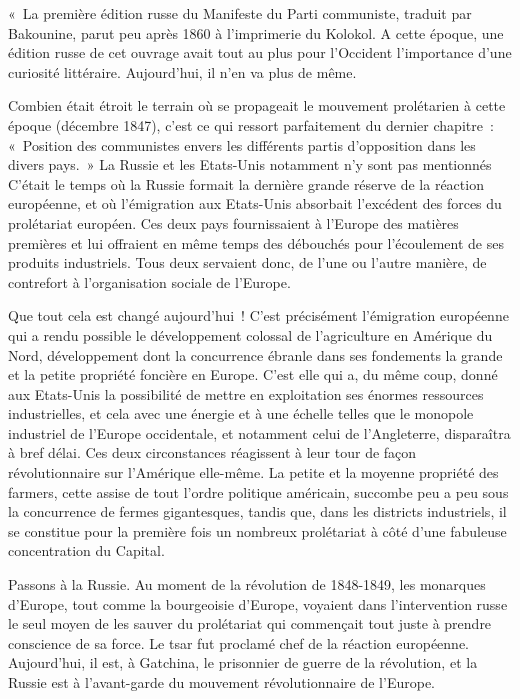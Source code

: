 \documentclass[french,twoside]{book} %
\newenvironment{quoteblock}%
  {\begin{quoting}}
  {\end{quoting}}
\newenvironment{quotebar}{%
    \def\FrameCommand{{\color{rubric!10!}\vrule width 0.5em} \hspace{0.9em}}%
    \def\OuterFrameSep{\itemsep} %
    \MakeFramed {\advance\hsize-\width \FrameRestore}
  }%
  {%
    \endMakeFramed
  }
\renewenvironment{quoteblock}%
  {%
    \savenotes
    \setstretch{0.9}
    \normalfont
    \begin{quotebar}
  }
  {%
    \end{quotebar}
    \spewnotes
  }
\begin{document}
\begin{quoteblock}
 \noindent « La première édition russe du Manifeste du Parti communiste, traduit par Bakounine, parut peu après 1860 à l’imprimerie du Kolokol. A cette époque, une édition russe de cet ouvrage avait tout au plus pour l’Occident l’importance d’une curiosité littéraire. Aujourd’hui, il n’en va plus de même.\par
 Combien était étroit le terrain où se propageait le mouvement prolétarien à cette époque (décembre 1847), c’est ce qui ressort parfaitement du dernier chapitre : « Position des communistes envers les différents partis d’opposition dans les divers pays. » La Russie et les Etats-Unis notamment n’y sont pas mentionnés C’était le temps où la Russie formait la dernière grande réserve de la réaction européenne, et où l’émigration aux Etats-Unis absorbait l’excédent des forces du prolétariat européen. Ces deux pays fournissaient à l’Europe des matières premières et lui offraient en même temps des débouchés pour l’écoulement de ses produits industriels. Tous deux servaient donc, de l’une ou l’autre manière, de contrefort à l’organisation sociale de l’Europe.\par
 Que tout cela est changé aujourd’hui ! C'est précisément l’émigration européenne qui a rendu possible le développement colossal de l’agriculture en Amérique du Nord, développement dont la concurrence ébranle dans ses fondements la grande et la petite propriété foncière en Europe. C'est elle qui a, du même coup, donné aux Etats-Unis la possibilité de mettre en exploitation ses énormes ressources industrielles, et cela avec une énergie et à une échelle telles que le monopole industriel de l’Europe occidentale, et notamment celui de l’Angleterre, disparaîtra à bref délai. Ces deux circonstances réagissent à leur tour de façon révolutionnaire sur l’Amérique elle-même. La petite et la moyenne propriété des farmers, cette assise de tout l’ordre politique américain, succombe peu a peu sous la concurrence de fermes gigantesques, tandis que, dans les districts industriels, il se constitue pour la première fois un nombreux prolétariat à côté d’une fabuleuse concentration du Capital.\par
 Passons à la Russie. Au moment de la révolution de 1848-1849, les monarques d’Europe, tout comme la bourgeoisie d’Europe, voyaient dans l’intervention russe le seul moyen de les sauver du prolétariat qui commençait tout juste à prendre conscience de sa force. Le tsar fut proclamé chef de la réaction européenne. Aujourd’hui, il est, à Gatchina, le prisonnier de guerre de la révolution, et la Russie est à l’avant-garde du mouvement révolutionnaire de l’Europe.\par

\end{quoteblock}
\end{document}

